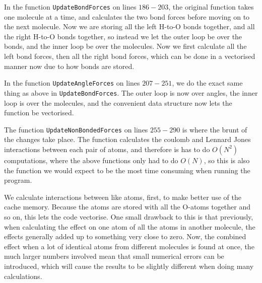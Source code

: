 \documentclass{article}
\begin{document}
In the function \texttt{UpdateBondForces} on lines $186-203$, the original function takes one molecule at a time, and calculates the two bond forces before moving on to the next molecule. Now we are storing all the left H-to-O bonds together, and all the right H-to-O bonds together, so instead we let the outer loop be over the bonds, and the inner loop be over the molecules. Now we first calculate all the left bond forces, then all the right bond forces, which can be done in a vectorised manner now due to how bonds are stored.

In the function \texttt{UpdateAngleForces} on lines $207-251$, we do the exact same thing as above in \texttt{UpdateBondForces}. The outer loop is now over angles, the inner loop is over the molecules, and the convenient data structure now lets the function be vectorised.

The function \texttt{UpdateNonBondedForces} on lines $255-290$ is where the brunt of the changes take place. The function calculates the coulomb and Lennard Jones interactions between each pair of atoms, and therefore is has to do $O(N^2)$ computations,  where the above functions only had to do $O(N)$, so this is also the function we would expect to be the most time consuming when running the program.


We calculate interactions between like atoms, first, to make better use of the cache memory. Because the atoms are stored with all the O-atoms together and so on, this lets the code vectorise. One small drawback to this is that previously, when calculating the effect on one atom of all the atoms in another molecule, the effects generally added up to something very close to zero. Now, the combined effect when a lot of identical atoms from different molecules is found at once, the much larger numbers involved mean that small numerical errors can be introduced, which will cause the results to be slightly different when doing many calculations.
\end{document}
